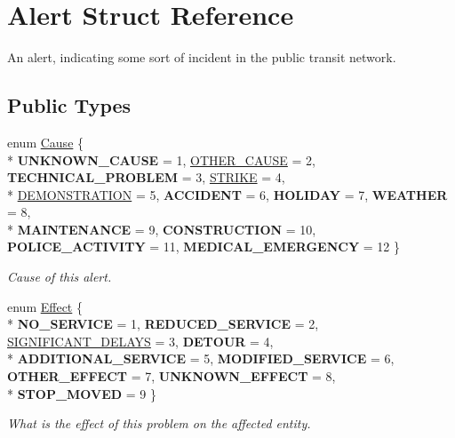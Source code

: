 \hypertarget{structAlert}{}\section{Alert Struct Reference}
\label{structAlert}


An alert, indicating some sort of incident in the public transit network.  


\subsection*{Public Types}
\begin{DoxyCompactItemize}
\item 
enum \hyperlink{structAlert_a199c4ca00d947ef89a8523c495ad2d2f}{Cause} \{ \\*
{\bfseries U\+N\+K\+N\+O\+W\+N\+\_\+\+C\+A\+U\+SE} = 1, 
\hyperlink{structAlert_a199c4ca00d947ef89a8523c495ad2d2fa301ef2cc38d1df284d2fe8f370a4c1a9}{O\+T\+H\+E\+R\+\_\+\+C\+A\+U\+SE} = 2, 
{\bfseries T\+E\+C\+H\+N\+I\+C\+A\+L\+\_\+\+P\+R\+O\+B\+L\+EM} = 3, 
\hyperlink{structAlert_a199c4ca00d947ef89a8523c495ad2d2facf63f18c599508648e1b6e026d024914}{S\+T\+R\+I\+KE} = 4, 
\\*
\hyperlink{structAlert_a199c4ca00d947ef89a8523c495ad2d2fa7a2833570b9073ac44d6f136943a22c1}{D\+E\+M\+O\+N\+S\+T\+R\+A\+T\+I\+ON} = 5, 
{\bfseries A\+C\+C\+I\+D\+E\+NT} = 6, 
{\bfseries H\+O\+L\+I\+D\+AY} = 7, 
{\bfseries W\+E\+A\+T\+H\+ER} = 8, 
\\*
{\bfseries M\+A\+I\+N\+T\+E\+N\+A\+N\+CE} = 9, 
{\bfseries C\+O\+N\+S\+T\+R\+U\+C\+T\+I\+ON} = 10, 
{\bfseries P\+O\+L\+I\+C\+E\+\_\+\+A\+C\+T\+I\+V\+I\+TY} = 11, 
{\bfseries M\+E\+D\+I\+C\+A\+L\+\_\+\+E\+M\+E\+R\+G\+E\+N\+CY} = 12
 \}\begin{DoxyCompactList}\small\item\em Cause of this alert. \end{DoxyCompactList}
\item 
enum \hyperlink{structAlert_a4378fb5cc59d723ec02ea80694678d98}{Effect} \{ \\*
{\bfseries N\+O\+\_\+\+S\+E\+R\+V\+I\+CE} = 1, 
{\bfseries R\+E\+D\+U\+C\+E\+D\+\_\+\+S\+E\+R\+V\+I\+CE} = 2, 
\hyperlink{structAlert_a4378fb5cc59d723ec02ea80694678d98a4b00b4d3a9ad0ee08c9756933a985d50}{S\+I\+G\+N\+I\+F\+I\+C\+A\+N\+T\+\_\+\+D\+E\+L\+A\+YS} = 3, 
{\bfseries D\+E\+T\+O\+UR} = 4, 
\\*
{\bfseries A\+D\+D\+I\+T\+I\+O\+N\+A\+L\+\_\+\+S\+E\+R\+V\+I\+CE} = 5, 
{\bfseries M\+O\+D\+I\+F\+I\+E\+D\+\_\+\+S\+E\+R\+V\+I\+CE} = 6, 
{\bfseries O\+T\+H\+E\+R\+\_\+\+E\+F\+F\+E\+CT} = 7, 
{\bfseries U\+N\+K\+N\+O\+W\+N\+\_\+\+E\+F\+F\+E\+CT} = 8, 
\\*
{\bfseries S\+T\+O\+P\+\_\+\+M\+O\+V\+ED} = 9
 \}\begin{DoxyCompactList}\small\item\em What is the effect of this problem on the affected entity. \end{DoxyCompactList}
\end{DoxyCompactItemize}
